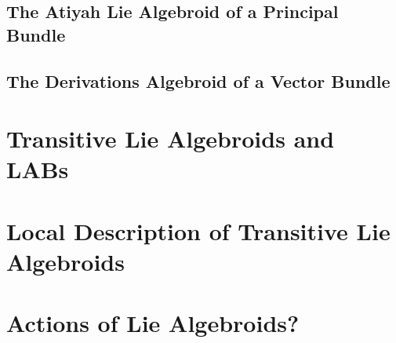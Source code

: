 \subsection{The Atiyah Lie Algebroid of a Principal Bundle}

\subsection{The Derivations Algebroid of a Vector Bundle}

\section{Transitive Lie Algebroids and LABs}

\section{Local Description of Transitive Lie Algebroids}

\section{Actions of Lie Algebroids?}